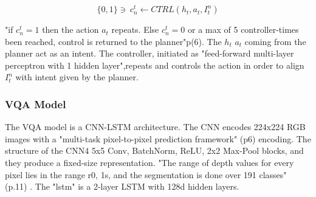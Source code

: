 
\[ \{0,1\}   \ni \ c_{n}^{t}  \leftarrow CTRL \left(h_{t} ,a_{t} ,I_{t}^{n}\right)  \]

"if \begin{math} c_{n}^{t} = 1 \end{math} then the action \begin{math} a_{t} \end{math} repeats. Else \begin{math} c_{n}^{t} = 0 \end{math} or a max of 5 controller-times been reached, control is returned to the planner"p(6). The \begin{math} h_{t} \end{math}   \begin{math} a_{t} \end{math} coming from the planner act as an intent. The controller, initiated  as "feed-forward multi-layer perceptron with 1 hidden layer",repeats and controls the action in order to align \begin{math}  I_{t}^{n} \end{math} with intent given by the planner. 

\subsubsection{VQA Model}



The VQA model is a CNN-LSTM architecture. The CNN encodes 224x224 RGB images with a "multi-task pixel-to-pixel prediction framework" (p6) encoding. The structure of the CNN4 {5x5 Conv, BatchNorm, ReLU, 2x2 Max-Pool blocks}, and they produce a fixed-size representation. "The range of depth values for every pixel lies in the range r0, 1s, and the segmentation is done over 191 classes" (p.11) \cite{embodiedqa}. The "lstm" is a 2-layer LSTM with 128d hidden layers.





